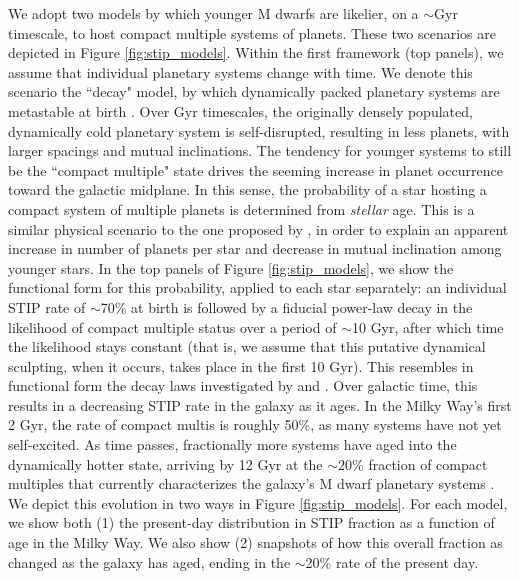 \documentclass[twocolumn]{aastex631}
\begin{document}
We adopt two models by which younger M dwarfs are likelier, on a $\sim$Gyr timescale, to host compact multiple systems of planets. These two scenarios are depicted in Figure \ref{fig:stip_models}. Within the first framework (top panels), we assume that individual planetary systems change with time. We denote this scenario the ``decay" model, by which dynamically packed planetary systems are metastable at birth \citep{Pu15, Volk15, zinzi_anti-correlation_2017}. Over Gyr timescales, the originally densely populated, dynamically cold planetary system is self-disrupted, resulting in less planets, with larger spacings and mutual inclinations. The tendency for younger systems to still be the ``compact multiple" state drives the seeming increase in planet occurrence toward the galactic midplane. In this sense, the probability of a star hosting a compact system of multiple planets is determined from \textit{stellar} age. This is a similar physical scenario to the one proposed by \cite{yang_planets_2023}, in order to explain an apparent increase in number of planets per star and decrease in mutual inclination among younger stars.  In the top panels of Figure \ref{fig:stip_models}, we show the functional form for this probability, applied to each star separately: an individual STIP rate of $\sim$70\% at birth is followed by a fiducial power-law decay in the likelihood of compact multiple status over a period of $\sim$10 Gyr, after which time the likelihood stays constant (that is, we assume that this putative dynamical sculpting, when it occurs, takes place in the first 10 Gyr). This resembles in functional form the decay laws investigated by \cite{lam_ages_2024} and \cite{Teixeira22}. Over galactic time, this results in a decreasing STIP rate in the galaxy as it ages. In the Milky Way's first 2 Gyr, the rate of compact multis is roughly 50\%, as many systems have not yet self-excited. As time passes, fractionally more systems have aged into the dynamically hotter state, arriving by 12 Gyr at the $\sim20$\% fraction of compact multiples that currently characterizes the galaxy's M dwarf planetary systems \citep{Muirhead15, Ballard16}. We depict this evolution in two ways in Figure \ref{fig:stip_models}. For each model, we show both (1) the present-day distribution in STIP fraction as a function of age in the Milky Way. We also show (2) snapshots of how this overall fraction as changed as the galaxy has aged, ending in the $\sim$20\% rate of the present day. 
\end{document}
